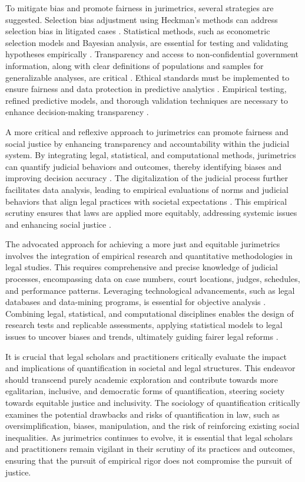 To mitigate bias and promote fairness in jurimetrics, several strategies are suggested. Selection bias adjustment using Heckman’s methods can address selection bias in litigated cases \cite{ribeiro1998}. Statistical methods, such as econometric selection models and Bayesian analysis, are essential for testing and validating hypotheses empirically \cite{ribeiro1998, zabala2019}. Transparency and access to non-confidential government information, along with clear definitions of populations and samples for generalizable analyses, are critical \cite{zabala1809}. Ethical standards must be implemented to ensure fairness and data protection in predictive analytics \cite{silva2023}. Empirical testing, refined predictive models, and thorough validation techniques are necessary to enhance decision-making transparency \cite{de2010, ribeiro1998}.

A more critical and reflexive approach to jurimetrics can promote fairness and social justice by enhancing transparency and accountability within the judicial system. By integrating legal, statistical, and computational methods, jurimetrics can quantify judicial behaviors and outcomes, thereby identifying biases and improving decision accuracy \cite{nunes2018, zabala1809}. The digitalization of the judicial process further facilitates data analysis, leading to empirical evaluations of norms and judicial behaviors that align legal practices with societal expectations \cite{colombo2017, massuanganhe2016}. This empirical scrutiny ensures that laws are applied more equitably, addressing systemic issues and enhancing social justice \cite{nunes2018, loevinger1949}.

The advocated approach for achieving a more just and equitable jurimetrics involves the integration of empirical research and quantitative methodologies in legal studies. This requires comprehensive and precise knowledge of judicial processes, encompassing data on case numbers, court locations, judges, schedules, and performance patterns. Leveraging technological advancements, such as legal databases and data-mining programs, is essential for objective analysis \cite{nunes2018}. Combining legal, statistical, and computational disciplines enables the design of research tests and replicable assessments, applying statistical models to legal issues to uncover biases and trends, ultimately guiding fairer legal reforms \cite{massuanganhe2016, maia2019}.

It is crucial that legal scholars and practitioners critically evaluate the impact and implications of quantification in societal and legal structures. This endeavor should transcend purely academic exploration and contribute towards more egalitarian, inclusive, and democratic forms of quantification, steering society towards equitable justice and inclusivity. The sociology of quantification critically examines the potential drawbacks and risks of quantification in law, such as oversimplification, biases, manipulation, and the risk of reinforcing existing social inequalities. As jurimetrics continues to evolve, it is essential that legal scholars and practitioners remain vigilant in their scrutiny of its practices and outcomes, ensuring that the pursuit of empirical rigor does not compromise the pursuit of justice.


